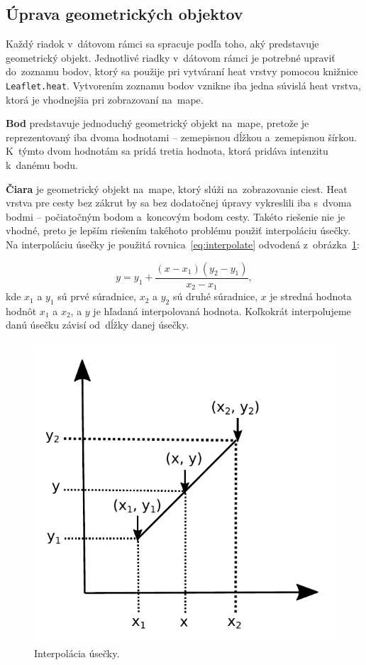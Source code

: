 \subsection*{Úprava geometrických objektov}
Každý riadok v~dátovom rámci sa spracuje podľa toho, aký predstavuje geometrický objekt. Jednotlivé riadky v~dátovom rámci je potrebné upraviť do~zoznamu bodov, ktorý sa použije pri vytváraní heat vrstvy pomocou knižnice \texttt{Leaflet.heat}. Vytvorením zoznamu bodov vznikne iba jedna súvislá heat vrstva, ktorá je vhodnejšia pri zobrazovaní na~mape.

\textbf{Bod} predstavuje jednoduchý geometrický objekt na~mape, pretože je reprezentovaný iba dvoma hodnotami \--- zemepisnou dĺžkou a~zemepisnou šírkou. K~týmto dvom hodnotám sa pridá tretia hodnota, ktorá pridáva intenzitu k~danému bodu.

\textbf{Čiara} je geometrický objekt na~mape, ktorý slúži na~zobrazovanie ciest. Heat vrstva pre cesty bez zákrut by sa bez dodatočnej úpravy vykreslili iba s~dvoma bodmi \--- počiatočným bodom a~koncovým bodom cesty. Takéto riešenie nie je vhodné, preto je lepším riešením takéhoto problému použiť interpoláciu úsečky. Na interpoláciu úsečky je použitá rovnica~\ref{eq:interpolate} odvodená z~obrázka~\ref{fig:interpolate}:

\begin{equation}
    y = y_1 + \frac{(x - x_1)(y_2 - y_1)}{x_2 - x_1},
    \label{eq:interpolate}
\end{equation}
kde $x_1$ a $y_1$ sú prvé súradnice, $x_2$ a $y_2$ sú druhé súradnice, $x$ je stredná hodnota hodnôt $x_1$ a $x_2$, a $y$ je hľadaná interpolovaná hodnota. Koľkokrát interpolujeme danú úsečku závisí od~dĺžky danej úsečky.

\begin{figure}[ht]
    \centering
    \includegraphics[width=0.4\linewidth]{obrazky-figures/linear-interpolation.pdf}
    \caption{Interpolácia úsečky.}
    \label{fig:interpolate}
\end{figure}

